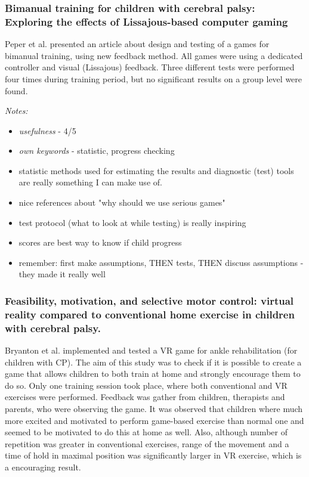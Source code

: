 \documentclass[10pt,a4paper]{article}
\begin{document}
\subsubsection*{Bimanual training for children with cerebral palsy: Exploring the effects of Lissajous-based computer gaming}

Peper et al. \cite{bimanual} presented an article about design and testing of a games for bimanual training, using new feedback method. All games were using a dedicated controller and visual (Lissajous) feedback. Three different tests were performed four times during training period, but no significant results on a group level were found. 

\emph{Notes:}
\begin{itemize}
\item \emph{usefulness} - 4/5
\item \emph{own keywords} - statistic, progress checking
\item statistic methods used for estimating the results and diagnostic (test) tools are really something I can make use of. 
\item nice references about "why should we use serious games"
\item test protocol (what to look at while testing) is really inspiring
\item scores are best way to know if child progress
\item remember: first make assumptions, THEN tests, THEN discuss assumptions - they made it really well
\end{itemize} 

\subsubsection*{Feasibility, motivation, and selective motor control: virtual reality compared to conventional home exercise in children with cerebral palsy.}

Bryanton et al. \cite{vr_cp} implemented and tested a VR game for ankle rehabilitation (for children with CP). The aim of this study was to check if it is possible to create a game that allows children to both train at home and strongly encourage them to do so. Only one training session took place, where both conventional and VR exercises were performed. Feedback was gather from children, therapists and parents, who were observing the game. It was observed that children where much more excited and motivated to perform game-based exercise than normal one and seemed to be motivated to do this at home as well. Also, although number of repetition was greater in conventional exercises, range of the movement and a time of hold in maximal position was significantly larger in VR exercise, which is a encouraging result.
\end{document}

